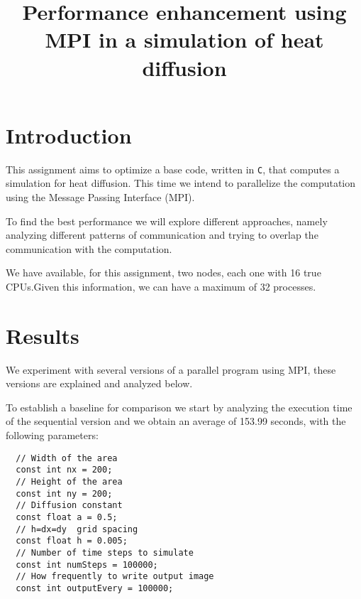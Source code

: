 \documentclass[conference]{IEEEtran}
\begin{document}
\title{Performance enhancement using MPI in a simulation of heat diffusion}

\author{
  \and
}

\maketitle



\section{Introduction}
This assignment aims to optimize a base code, written in \texttt{C}, that computes a simulation for heat diffusion. This time we intend to parallelize the computation using the Message Passing Interface (MPI).

To find the best performance we will explore different approaches, namely analyzing different patterns of communication and trying to overlap the communication with the computation.

We have available, for this assignment, two nodes, each one with 16 true CPUs.\@ Given this information, we can have a maximum of 32 processes.


\section{Results}
We experiment with several versions of a parallel program using MPI, these versions are explained and analyzed below.

To establish a baseline for comparison we start by analyzing the execution time of the sequential version and we obtain an average of 153.99 seconds, with the following parameters:
\begin{verbatim}
  // Width of the area
  const int nx = 200;
  // Height of the area
  const int ny = 200;
  // Diffusion constant           
  const float a = 0.5;
  // h=dx=dy  grid spacing
  const float h = 0.005;
  // Number of time steps to simulate
  const int numSteps = 100000;  
  // How frequently to write output image
  const int outputEvery = 100000;
\end{verbatim}
\end{document}
